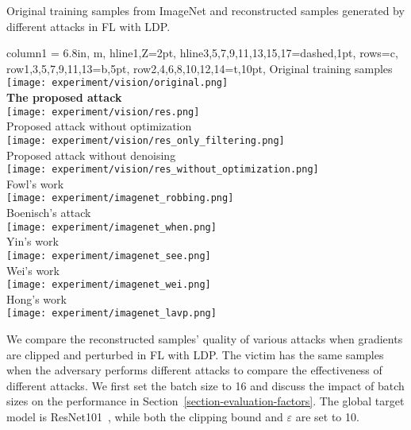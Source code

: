 \documentclass[lettersize,journal]{IEEEtran}
\begin{document}
\begin{table*}
\caption{Original training samples from ImageNet and reconstructed samples generated by different attacks in FL with LDP.}
\centering
\label{table-evaluation-vision}
\begin{tblr}{
    column{1} = {6.8in, m}, hline{1,Z}={2pt}, hline{3,5,7,9,11,13,15,17}={dashed,1pt}, rows={c},
    row{1,3,5,7,9,11,13}={b,5pt}, row{2,4,6,8,10,12,14}={t,10pt},
}
Original training samples\\
\texttt{[image: experiment/vision/original.png]}\\
\textbf{The proposed attack}\\
\texttt{[image: experiment/vision/res.png]}\\
Proposed attack without optimization\\
\texttt{[image: experiment/vision/res\_only\_filtering.png]}\\
Proposed attack without denoising\\
\texttt{[image: experiment/vision/res\_without\_optimization.png]}\\
Fowl's work~\cite{fowl2022robbing}\\
\texttt{[image: experiment/imagenet\_robbing.png]}\\
Boenisch's attack~\cite{Boenisch2021When}\\
\texttt{[image: experiment/imagenet\_when.png]}\\
Yin's work~\cite{Yin2021see}\\
\texttt{[image: experiment/imagenet\_see.png]}\\
Wei's work~\cite{Wei2020Framework}\\
\texttt{[image: experiment/imagenet\_wei.png]}\\
Hong's work~\cite{hong2024foreseeing}\\
\texttt{[image: experiment/imagenet\_lavp.png]}\\
\end{tblr}
\label{table-experiment}
\end{table*}

We compare the reconstructed samples' quality of various attacks when gradients are clipped and perturbed in FL with LDP. The victim has the same samples when the adversary performs different attacks to compare the effectiveness of different attacks. We first set the batch size to 16 and discuss the impact of  batch sizes on the performance in Section~\ref{section-evaluation-factors}. The global target model is ResNet101~\cite{he2016deep}, while both the clipping bound and $\varepsilon$ are set to 10.
\end{document}
